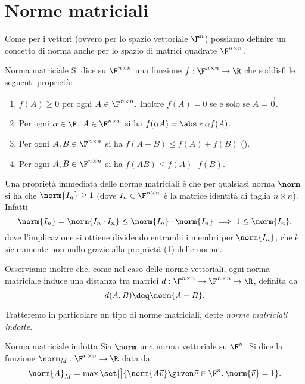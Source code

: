 \section{Norme matriciali}

Come per i vettori (ovvero per lo spazio vettoriale $\F^n$) possiamo definire un concetto di norma anche per lo spazio di matrici quadrate $\Mat{\F, n, n}$.

\begin{definition}
    {Norma matriciale}{}
    Si dice  su $\Mat{\F, n, n}$ una funzione $f : \Mat{\F, n, n} \to \R$ che soddisfi le seguenti proprietà: 
    \begin{enumerate}[(1)]
        \item $f(A) \geq 0$ per ogni $A \in \Mat{\F, n, n}$. Inoltre $f(A) = 0$ se e solo se $A = \vec 0$.
        \item Per ogni $\alpha \in \F$, $A \in \Mat{\F, n, n}$ si ha $f(\alpha A) = \abs*{\alpha}f(A)$.
        \item Per ogni $A, B \in \Mat{\F, n, n}$ si ha $f(A + B) \leq f(A) + f(B)$ ().
        \item Per ogni $A, B \in \Mat{\F, n, n}$ si ha $f(AB) \leq f(A) \cdot f(B)$. 
    \end{enumerate} 
\end{definition}

Una proprietà immediata delle norme matriciali è che per qualsiasi norma $\norm$ si ha che $\norm{I_n} \geq 1$ (dove $I_n \in \Mat{\F, n, n}$ è la matrice identità di taglia $n \times n$). Infatti \[
    \norm{I_n} = \norm{I_n \cdot I_n} \leq \norm{I_n} \cdot \norm{I_n} \implies 1 \leq \norm{I_n},
\] dove l'implicazione si ottiene dividendo entrambi i membri per $\norm{I_n}$, che è sicuramente non nullo grazie alla proprietà (1) delle norme.

Osserviamo inoltre che, come nel caso delle norme vettoriali, ogni norma matriciale induce una distanza tra matrici $d : \Mat{\F, n, n} \to \Mat{\F, n, n} \to \R$, definita da \[
    d(A, B) \deq \norm{A - B}.
\]

Tratteremo in particolare un tipo di norme matriciali, dette \emph{norme matriciali indotte}.

\begin{definition}
    {Norma matriciale indotta}{}
    Sia $\norm$ una norma vettoriale su $\F^n$. Si dice  la funzione $\norm_M : \Mat{\F, n, n} \to \R$ data da \begin{align*}
        \norm{A}_M = \max \set[\big]{\norm{A\vec{v}} \given \vec v \in \F^n, \norm{\vec v}= 1}.
    \end{align*}
\end{definition}

